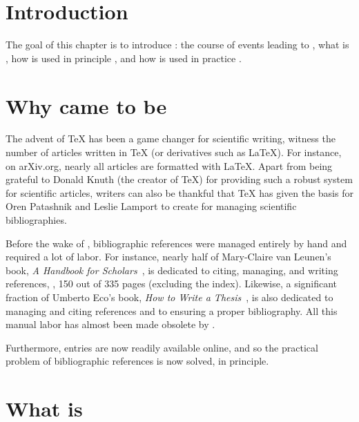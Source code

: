 
\section{Introduction}
The goal of this chapter is to introduce {\bibtex}: the course of
events leading to {\bibtex} , what
{\bibtex} is , how {\bibtex} is used
in principle , and how {\bibtex} is
used in practice .


\section{Why {\bibtex} came to be}
\label{sec:why_bibtex_came_to_be}

The advent of {\TeX} has been a game changer for scientific writing,
witness the number of articles written in {\TeX} (or derivatives such
as {\LaTeX}).  For instance, on arXiv.org, nearly all articles are
formatted with \LaTeX.  Apart from being grateful to Donald Knuth (the
creator of \TeX) for providing such a robust system for scientific
articles, writers can also be thankful that {\TeX} has given the basis
for Oren Patashnik and Leslie Lamport to create {\bibtex} for managing
scientific bibliographies.

Before the wake of {\bibtex}, bibliographic references were managed
entirely by hand and required a lot of labor.  For instance, nearly
half of Mary-Claire van Leunen's book, \textit{A Handbook for
  Scholars}~\cite{leunen1992_handbook}, is dedicated to citing,
managing, and writing references, \ie, 150 out of 335 pages (excluding
the index).  Likewise, a significant fraction of Umberto Eco's book,
\textit{How to Write a Thesis}~\cite{eco1985_thesis}, is also
dedicated to managing and citing references and to ensuring a proper
bibliography.  All this manual labor has almost been made obsolete by
{\bibtex}.

Furthermore, {\bibtex} entries are now readily available online, and so
the practical problem of bibliographic references is now solved, in
principle.

\section{What is {\bibtex}}
\label{sec:principles_of_bibtex}

